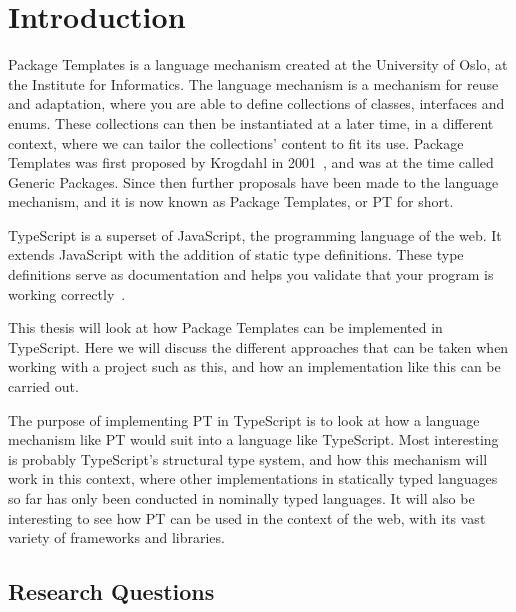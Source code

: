 
\chapter{Introduction}\label{ch:introduction}


Package Templates is a language mechanism created at the University of Oslo, at the Institute for Informatics.
The language mechanism is a mechanism for reuse and adaptation, where you are able to define collections of classes, interfaces and enums.
These collections can then be instantiated at a later time, in a different context, where we can tailor the collections' content to fit its use.
Package Templates was first proposed by Krogdahl in 2001~\cite{krogdahl:GP}, and was at the time called Generic Packages.
Since then further proposals have been made to the language mechanism, and it is now known as Package Templates, or PT for short.

TypeScript is a superset of JavaScript, the programming language of the web.
It extends JavaScript with the addition of static type definitions.
These type definitions serve as documentation and helps you validate that your program is working correctly~\cite{tswebsite}.

This thesis will look at how Package Templates can be implemented in TypeScript.
Here we will discuss the different approaches that can be taken when working with a project such as this, and how an implementation like this can be carried out.

The purpose of implementing PT in TypeScript is to look at how a language mechanism like PT would suit into a language like TypeScript.
Most interesting is probably TypeScript's structural type system, and how this mechanism will work in this context, where other implementations in statically typed languages so far has only been conducted in nominally typed languages.
It will also be interesting to see how PT can be used in the context of the web, with its vast variety of frameworks and libraries.

\section{Research Questions}\label{sec:research-questions}


